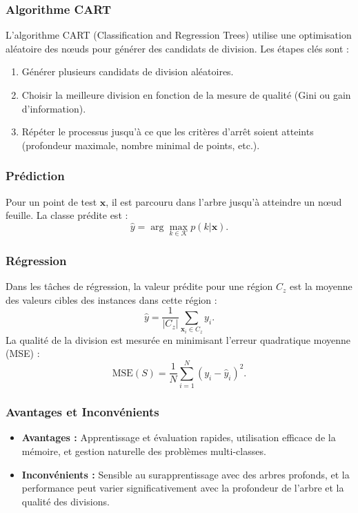 \documentclass[a4paper,portrait]{article}
\begin{document}
\begin{multicols}{2}
\subsubsection{Algorithme CART}
L'algorithme CART (Classification and Regression Trees) utilise une optimisation aléatoire des nœuds pour générer des candidats de division. Les étapes clés sont :
\begin{enumerate}
    \item Générer plusieurs candidats de division aléatoires.
    \item Choisir la meilleure division en fonction de la mesure de qualité (Gini ou gain d'information).
    \item Répéter le processus jusqu'à ce que les critères d'arrêt soient atteints (profondeur maximale, nombre minimal de points, etc.).
\end{enumerate}

\subsubsection{Prédiction}
Pour un point de test \( \mathbf{x} \), il est parcouru dans l'arbre jusqu'à atteindre un nœud feuille. La classe prédite est :
\[
\hat{y} = \arg \max_{k \in \mathcal{K}} p(k | \mathbf{x}).
\]

\subsubsection{Régression}
Dans les tâches de régression, la valeur prédite pour une région \( C_z \) est la moyenne des valeurs cibles des instances dans cette région :
\[
\hat{y} = \frac{1}{|C_z|} \sum_{\mathbf{x}_i \in C_z} y_i.
\]
La qualité de la division est mesurée en minimisant l'erreur quadratique moyenne (MSE) :
\[
\text{MSE}(S) = \frac{1}{N} \sum_{i=1}^N (y_i - \hat{y}_i)^2.
\]

\subsubsection{Avantages et Inconvénients}
\begin{itemize}
    \item \textbf{Avantages :} Apprentissage et évaluation rapides, utilisation efficace de la mémoire, et gestion naturelle des problèmes multi-classes.
    \item \textbf{Inconvénients :} Sensible au surapprentissage avec des arbres profonds, et la performance peut varier significativement avec la profondeur de l'arbre et la qualité des divisions.
\end{itemize}


\end{multicols}
\end{document}
